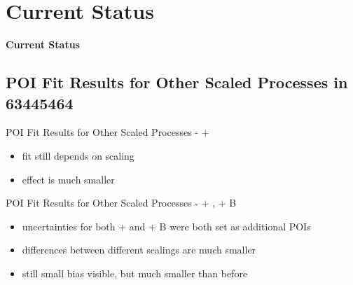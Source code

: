 \section{Current Status}
\begin{frame}
\centering
\textbf{\Huge{Current Status}}
\end{frame}

\subsection{POI Fit Results for Other Scaled Processes in 63445464}

\begin{frame}{POI Fit Results for Other Scaled Processes - \ttbar + \bbbar}
\vskip -0.3cm
\begin{scriptsize}

\end{scriptsize}
\begin{itemize}
\item fit still depends on scaling
\item effect is much smaller
\end{itemize}
\end{frame}

\begin{frame}{POI Fit Results for Other Scaled Processes - \ttbar + \bbbar, \ttbar + B}
\vskip -0.3cm
\begin{scriptsize}

\end{scriptsize}

\begin{itemize}
\item uncertainties for both \ttbar + \bbbar and \ttbar + B were both set as additional POIs
\item differences between different scalings are much smaller
\item still small bias visible, but much smaller than before
\end{itemize}
\end{frame}
